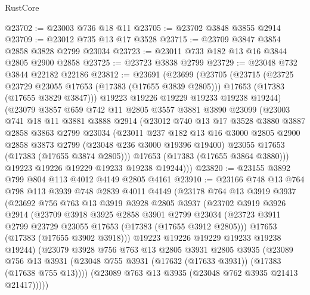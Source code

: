 \begin{lexlean}{RustCore}
\begin{coremodule}
@23702 := @23003 @736 @18 @11
@23705 := @23702 @3848 @3855 @2914
@23709 := @23012 @735 @13 @17 @3528
@23715 := @23709 @3847 @3854 @2858 @3828 @2799 @23034
@23723 := @23011 @733 @182 @13 @16 @3844 @2805 @2900 @2858
@23725 := @23723 @3838 @2799
@23729 := @23048 @732 @3844 @22182 @22186
@23812 := @23691
    (@23699
      (@23705
        (@23715
          (@23725 @23729 @23055 @17653 (@17383 (@17655 @3839 @2805)))
          @17653
          (@17383 (@17655 @3829 @3847)))
        @19223
        @19226
        @19229
        @19233
        @19238
        @19244)
      (@23079
        @3857
        @659
        @742
        @11
        @2805
        @3557
        @3881
        @3890
        @23099
        (@23003
          @741
          @18
          @11
          @3881
          @3888
          @2914
          (@23012
            @740
            @13
            @17
            @3528
            @3880
            @3887
            @2858
            @3863
            @2799
            @23034
            (@23011
              @237
              @182
              @13
              @16
              @3000
              @2805
              @2900
              @2858
              @3873
              @2799
              (@23048 @236 @3000 @19396 @19400)
              @23055
              @17653
              (@17383 (@17655 @3874 @2805)))
            @17653
            (@17383 (@17655 @3864 @3880)))
          @19223
          @19226
          @19229
          @19233
          @19238
          @19244)))
@23820 := @23155 @3892 @799 @804 @113 @4012 @4149 @2805 @4161
@23910 := @23166
    @748
    @13
    @764
    @798
    @113
    @3939
    @748
    @2839
    @4011
    @4149
    (@23178
      @764
      @13
      @3919
      @3937
      (@23692
        @756
        @763
        @13
        @3919
        @3928
        @2805
        @3937
        (@23702
          @3919
          @3926
          @2914
          (@23709
            @3918
            @3925
            @2858
            @3901
            @2799
            @23034
            (@23723 @3911 @2799 @23729 @23055 @17653 (@17383 (@17655 @3912 @2805)))
            @17653
            (@17383 (@17655 @3902 @3918)))
          @19223
          @19226
          @19229
          @19233
          @19238
          @19244)
        (@23079
          @3928
          @756
          @763
          @13
          @2805
          @3931
          @2805
          @3935
          (@23089
            @756
            @13
            @3931
            (@23048 @755 @3931 (@17632 (@17633 @3931)) (@17383 (@17638 @755 @13))))
          (@23089 @763 @13 @3935 (@23048 @762 @3935 @21413 @21417)))))

\end{coremodule}
\end{lexlean}
